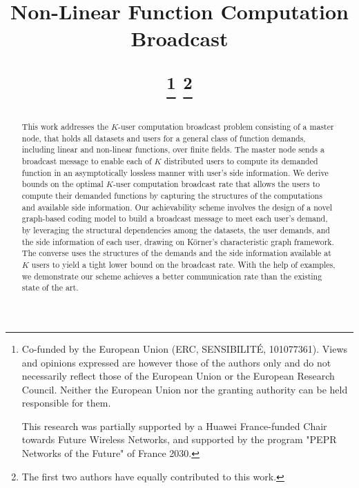 \documentclass[conference, letterpaper]{IEEEtran} %
\begin{document}
\title{Non-Linear Function Computation Broadcast

\thanks{Co-funded by the European Union (ERC, SENSIBILITÉ, 101077361). Views and opinions expressed are however those of the authors only and do not necessarily reflect those of the European Union or the European Research Council. Neither the European Union nor the granting authority can be held responsible for them. 

This research was partially supported by a Huawei France-funded Chair towards Future Wireless Networks, and supported by the program "PEPR Networks of the Future" of France 2030.}
\thanks{%
The first two authors have equally contributed to this work.}
} 
\author{
   }



\maketitle

\begin{abstract}
This work addresses the $K$-user computation broadcast problem consisting of a master node, that holds all datasets and users for a general class of function demands, including linear and non-linear functions, over finite fields. 
The master node sends a broadcast message to enable each of $K$ distributed users to compute its demanded function in an asymptotically lossless manner with user's side information. 
We derive bounds on the optimal $K$-user computation broadcast rate that allows the users to compute their demanded functions by capturing the structures of the computations and available side information.
Our achievability scheme involves the design of a novel graph-based coding model to build a broadcast message to meet each user's demand, by leveraging the structural dependencies among the datasets, the user demands, and the side information of each user, drawing on K{\"o}rner's characteristic graph framework. 
The converse uses the structures of the demands and the side information available at $K$ users to yield a tight lower bound on the broadcast rate. 
With the help of examples, we demonstrate our scheme achieves a better communication rate than the existing state of the art. 
\end{abstract}
\end{document}
